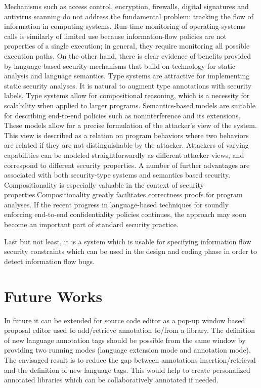 Mechanisms such as access control, encryption, firewalls, digital
signatures and antivirus scanning do not address the fundamental
problem: tracking the flow of information in computing
systems. Run-time monitoring of operating-systems calls is
similarly of limited use because information-flow policies are
not properties of a single execution; in general, they require
monitoring all possible execution paths. On the other hand,
there is clear evidence of benefits provided by language-based
security mechanisms that build on technology for static analysis
and language semantics. Type systems are attractive for
implementing static security analyses. It is natural to augment
type annotations with security labels. Type systems allow for
compositional reasoning, which is a necessity for scalability
when applied to larger programs. Semantics-based models
are suitable for describing end-to-end policies such as
noninterference and its extensions. These models allow for a
precise formulation of the attacker's view of the system. This
view is described as a relation on program behaviors where
two behaviors are related if they are not distinguishable by
the attacker. Attackers of varying capabilities can be modeled
straightforwardly as different attacker views, and correspond
to different security properties. A number of further advantages are
associated with both security-type systems and semantics based
security. Compositionality is especially valuable in the
context of security properties.Compositionality
greatly facilitates correctness proofs for program analyses. If the recent
progress in language-based techniques for soundly enforcing
end-to-end confidentiality policies continues, the approach
may soon become an important part of standard security
practice.

Last but not least, it is a system which is usable for specifying information flow security constraints which can be used in the design and coding phase in order to detect information flow bugs.





\section{ Future Works}
In future it can be extended for source code editor as
a pop-up window based proposal editor used to add/retrieve
annotation to/from a library. The definition of new language
annotation tags should be possible from the same window by
providing two running modes (language extension mode and
annotation mode). The envisaged result is to reduce the gap
between annotations insertion/retrieval and the definition of
new language tags. This would help to create personalized
annotated libraries which can be collaboratively annotated if
needed.

